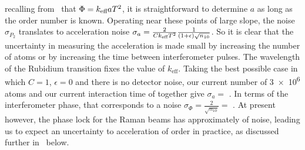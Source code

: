 recalling from~ that $\Phi =
k_\textnormal{eff}
a T^2$, it is straightforward to determine $a$ as long as the
order number is known. Operating near these points of large slope, the
noise $\sigma_{P_2}$ translates to acceleration noise $\sigma_a =
\frac{2}{C k_\textnormal{eff} T^2} \frac{1}{(1+\epsilon)\sqrt{n_{10}}}$. 
So it is clear that the uncertainty in measuring the acceleration is
made small by
increasing the number of atoms or by increasing the time between
interferometer pulses. The wavelength of the Rubidium transition fixes
the value of $k_\text{eff}$. Taking the best possible case in which
$C=1$, $\epsilon = 0$ and there is no detector noise, our current
number of \num{3e6} atoms and our current interaction time of
 together give $\sigma_a =
$ . In terms of the
interferometer phase, that corresponds to a noise $\sigma_\Phi =
\frac{2}{\sqrt{n_{10}}} = $ . At present
however, the phase lock for the Raman beams has approximately
 of noise, leading us to expect an
uncertainty to acceleration of order
 in practice, as discussed
further in~ below.
